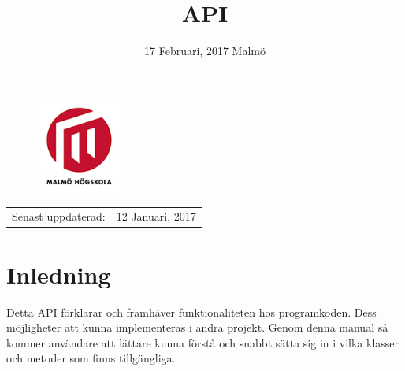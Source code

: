 \documentclass[11pt, numbers=endperiod]{report}
\title{API} %
\author{}%
\date{17 Februari, 2017 Malmö} %
\begin{document}
\begin{titlepage}


\clearpage\maketitle %
\thispagestyle{empty}

\begin{figure}[h!]
	\begin{center}
		\includegraphics[width=0.25\textwidth]{MAH_logotyp_original}
	\end{center}
\end{figure}

\begin{center}
\begin{tabular}{l r}
Senast uppdaterad: & 12 Januari, 2017 \\ %
\end{tabular}
\end{center}

\end{titlepage}

\clearpage


\tableofcontents

\thispagestyle{empty}\newpage
\setcounter{page}{1}


\section{Inledning}
Detta API förklarar och framhäver funktionaliteten hos programkoden. Dess möjligheter att kunna implementeras i andra projekt. Genom denna manual så kommer användare att lättare kunna förstå och snabbt sätta sig in i vilka klasser och metoder som finns tillgängliga.\\
\end{document}
